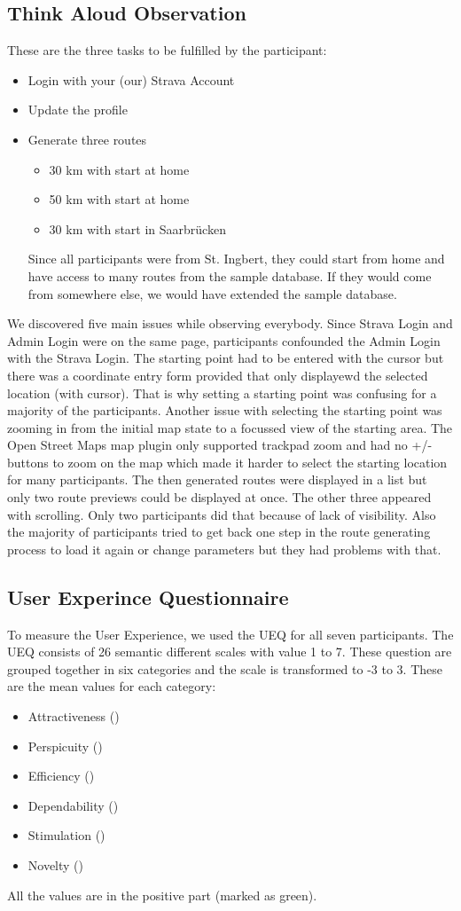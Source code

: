 \documentclass{sigchi}
\begin{document}
\subsection{Think Aloud Observation}
These are the three tasks to be fulfilled by the participant:
\begin{itemize}
\item Login with your (our) Strava Account
\item Update the profile
\item Generate three routes
\begin{itemize}
\item 30 km with start at home
\item 50 km with start at home
\item 30 km with start in Saarbrücken
\end{itemize}
Since all participants were from St. Ingbert, they could start from home and have access to many routes from the sample database. If they would come from somewhere else, we would have extended the sample database.
\end{itemize}
We discovered five main issues while observing everybody. Since Strava Login and Admin Login were on the same page, participants confounded the Admin Login with the Strava Login. 
The starting point had to be entered with the cursor but there was a coordinate entry form provided that only displayewd the selected location (with cursor). That is why setting a starting point was confusing for a majority of the participants. Another issue with selecting the starting point was zooming in from the initial map state to a focussed view of the starting area. The Open Street Maps map plugin only supported trackpad zoom and had no +/- buttons to zoom on the map which made it harder to select the starting location for many participants.
The then generated routes were displayed in a list but only two route previews could be displayed at once. The other three appeared with scrolling. Only two participants did that because of lack of visibility.
Also the majority of participants tried to get back one step in the route generating process to load it again or change parameters but they had problems with that.

\subsection{User Experince Questionnaire}
To measure the User Experience, we used the UEQ for all seven participants. The UEQ consists of 26 semantic different scales with value 1 to 7. These question are grouped together in six categories and the scale is transformed to -3 to 3.
These are the mean values for each category:
\begin{itemize}
//TODO mean values
\item Attractiveness ()
\item Perspicuity ()
\item Efficiency ()
\item Dependability ()
\item Stimulation ()
\item Novelty ()
\end{itemize}
All the values are in the positive part (marked as green).
\end{document}

